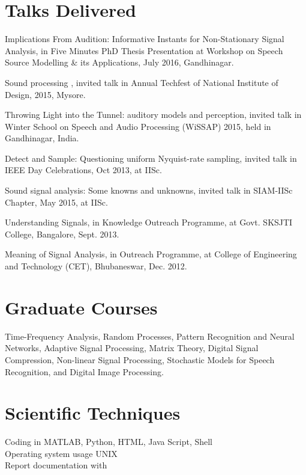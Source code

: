 \documentclass[line]{resume}
\begin{document}
{\begin{resume}
    \section{\mysidestyle Talks Delivered} 
    \vspace{5mm}
    \begin{list2}
    \item Implications From Audition: Informative Instants for Non-Stationary Signal Analysis, in Five Minutes PhD Thesis Presentation at
    Workshop on Speech Source Modelling \& its Applications, July 2016, Gandhinagar.
    \item Sound processing , invited talk in Annual Techfest of National Institute of Design, 2015, Mysore.
    \item Throwing Light into the Tunnel: auditory models and perception, invited talk in Winter School on Speech and Audio Processing (WiSSAP) 2015, held in Gandhinagar, India.
    \item Detect and Sample: Questioning uniform Nyquist-rate sampling, invited talk in IEEE Day Celebrations, Oct 2013, at IISc.
    \item Sound signal analysis: Some knowns and unknowns, invited talk in SIAM-IISc Chapter, May 2015, at IISc.
    \item Understanding Signals, in Knowledge Outreach Programme, at Govt. SKSJTI College, Bangalore, Sept. 2013.
    \item Meaning of Signal Analysis, in Outreach Programme, at College of Engineering and Technology (CET), Bhubaneswar, Dec. 2012.
    \end{list2}
    \vspace{-2.5mm}
    \section{\mysidestyle Graduate Courses} 
    \vspace{2.5mm}
    Time-Frequency Analysis, Random Processes, Pattern Recognition and Neural Networks, Adaptive Signal Processing, Matrix Theory,
    Digital Signal Compression, Non-linear Signal Processing, Stochastic Models for Speech Recognition, and Digital Image Processing.
    \vspace{-3.5mm}
    \section{\mysidestyle Scientific Techniques} 
    \vspace{2.5mm}
     Coding in MATLAB, Python, HTML, Java Script, Shell \vspace{1mm}\\
     Operating system usage UNIX \vspace{1mm}\\
     Report documentation with \LaTeXe
    \vspace{-3.5mm}

\end{resume}}
\end{document}
